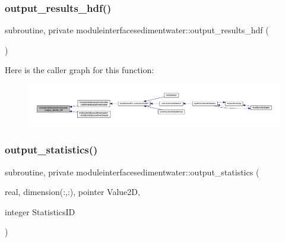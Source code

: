 \subsubsection{\texorpdfstring{output\+\_\+results\+\_\+hdf()}{output\_results\_hdf()}}
{\footnotesize\ttfamily subroutine, private moduleinterfacesedimentwater\+::output\+\_\+results\+\_\+hdf (\begin{DoxyParamCaption}{ }\end{DoxyParamCaption})\hspace{0.3cm}{\ttfamily [private]}}

Here is the caller graph for this function\+:\nopagebreak
\begin{figure}[H]
\begin{center}
\leavevmode
\includegraphics[width=350pt]{namespacemoduleinterfacesedimentwater_ab623073c171ba3d532b1c1ec393f91b6_icgraph}
\end{center}
\end{figure}
\mbox{\label{namespacemoduleinterfacesedimentwater_aa57d7b6cd225347d61e24202cb55d26b}} 
\subsubsection{\texorpdfstring{output\+\_\+statistics()}{output\_statistics()}}
{\footnotesize\ttfamily subroutine, private moduleinterfacesedimentwater\+::output\+\_\+statistics (\begin{DoxyParamCaption}\item[{real, dimension(\+:,\+:), pointer}]{Value2D,  }\item[{integer}]{Statistics\+ID }\end{DoxyParamCaption})\hspace{0.3cm}{\ttfamily [private]}}

